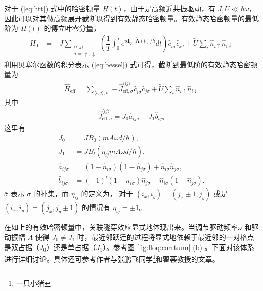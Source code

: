 对于 (\ref{eq:htt}) 式中的哈密顿量 $H(t)$，由于是高频近共振驱动，有 $J, \tilde{U}\ll\hbar\omega$，因此可以对其做高频展开截断以得到有效静态哈密顿量。有效静态哈密顿量的最低阶为 $H(t)$ 的傅立叶零分量，
\begin{align}
H_0 &= -J \sum_{\substack{\langle i,j\rangle \\ \sigma = \uparrow,\downarrow}} \left(\dfrac{1}{T}\int_0^Te^{i\mathbf{d_{ij}}\cdot \tilde{\mathbf{A}}(t)/\hbar}dt\right) \hat{c}_{i\sigma}^{\dagger}\hat{c}_{j\sigma}+ \tilde{U}\sum_i\hat{n}_{i\uparrow}\hat{n}_{i\downarrow} 
\end{align}
利用贝塞尔函数的积分表示 (\ref{eq:bessel}) 式可得，截断到最低阶的有效静态哈密顿量为
\begin{align}
\hat{H}_{\text{eff}} = \sum_{\langle i,j\rangle, \sigma} -\hat{J}^{\langle ij\rangle}_{\text{eff},\sigma}\hat{c}_{i\sigma}^{\dagger}\hat{c}_{j\sigma} + \tilde{U}\sum_{i}\hat{n}_{i\uparrow}\hat{n}_{i\downarrow}
\end{align}
其中
\begin{align}
\hat{J}^{\langle ij\rangle}_{\text{eff},\sigma}=J_0\hat{a}_{ij\bar{\sigma}}+J_1\hat{b}_{ij\bar{\sigma}}
\end{align}
这里有
\begin{align}
J_0 &= JB_0(mA\omega d/\hbar), \\
J_1 &= J B_l(\eta_{ij}mA\omega d/\hbar), \\
\hat{a}_{ij\sigma} &= (1-\hat{n}_{i\sigma})(1-\hat{n}_{j\sigma}) + \hat{n}_{i\sigma}\hat{n}_{j\sigma},\\
\hat{b}_{ij\sigma} &= (-1)^l(1-\hat{n}_{i\sigma})\hat{n}_{j\sigma} + \hat{n}_{i\sigma}(1-\hat{n}_{j\sigma}).
\end{align}
$\bar{\sigma}$ 表示 $\sigma$ 的补集，而
$\eta_{ij}$ 的定义为，
对于 $(i_x,i_y)=(j_x\pm1,j_y)$ 或是 $(i_x,i_y)=(j_x,j_y\pm 1)$ 的情况有 $\eta_{ij}=\pm 1$。

在如上的有效哈密顿量中，关联隧穿效应显式地体现出来。当调节驱动频率$\omega$ 和驱动振幅 $A$ 使得 $J_0\neq J_1$ 时，最近邻跃迁的过程将显式地依赖于最近邻的一对格点是双占据（$J_0$）还是单占据（$J_1$）。参考图 \ref{fig:floq:corrtunn} (b) 。下面对该体系进行详细讨论。具体还可参考作者与张鹏飞同学\footnote{一只小猪}和翟荟教授的文章。




